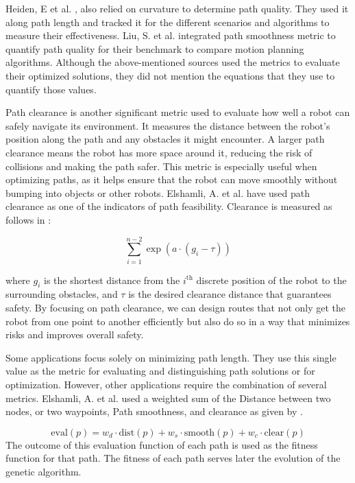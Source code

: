 Heiden, E et al. \cite{R23}, also relied on curvature to determine path quality. They used it along 
path length and tracked it for the different scenarios and algorithms to measure their effectiveness.
Liu, S. et al. integrated path smoothness metric to quantify path quality for their benchmark to compare
motion planning algorithms\cite{R35}.
Although the above-mentioned sources used the metrics to evaluate their optimized solutions,
they did not mention the equations that they use to quantify those values.

Path clearance is another significant metric used to evaluate how well a robot can safely navigate 
its environment. It measures the distance between the robot's position along the path and any obstacles 
it might encounter. A larger path clearance means the robot has more space around it, reducing the risk 
of collisions and making the path safer. This metric is especially useful when optimizing paths, as it 
helps ensure that the robot can move smoothly without bumping into objects or other robots. 
Elshamli, A. et al. \cite{R17} have used path clearance as one of the indicators of path feasibility.
Clearance is measured as follows in :

\begin{equation}
    \sum_{i=1}^{n-2} \exp\left(a \cdot (g_i - \tau)\right)
    \label{clear}
\end{equation}

where \(g_i\) is the shortest distance from the \(i^{\text{th}}\) discrete position of the 
robot to the surrounding obstacles, and \(\tau\) is the desired clearance distance that 
guarantees safety. By focusing 
on path clearance, we can design routes that not only get the robot from one point to another efficiently 
but also do so in a way that minimizes risks and improves overall safety.


Some applications focus solely on minimizing path length. They use this single value as the 
metric for evaluating and distinguishing path solutions or for optimization. However, other 
applications require the combination of several metrics.
Elshamli, A. et al. \cite{R17} used a weighted sum of the Distance between two nodes, or two waypoints,
Path smoothness, and clearance as given by . 

\begin{equation}
    \text{eval}(p) = w_d \cdot \text{dist}(p) + w_s \cdot \text{smooth}(p) + w_c \cdot \text{clear}(p)
    \label{evaluation}
\end{equation}
The outcome of this evaluation function of each path is used as the fitness function for that path.
The fitness of each path serves later the evolution of the genetic algorithm.

